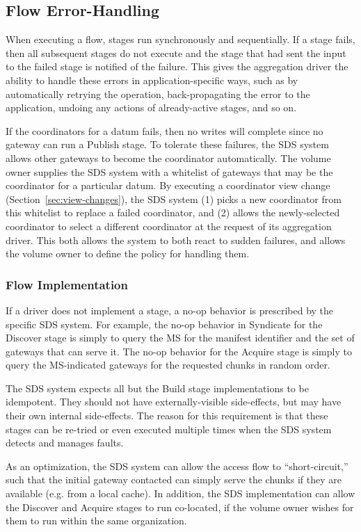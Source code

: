 \subsection{Flow Error-Handling}

When executing a flow, stages run synchronously and sequentially.
If a stage fails, then all subsequent stages do not execute
and the stage that had sent the input to the
failed stage is notified of the failure.  This gives the aggregation driver
the ability to handle these errors in application-specific ways, such as by
automatically retrying the operation, back-propagating the error to the application, 
undoing any actions of already-active stages, and so on.

If the coordinators for a datum fails, then no writes will complete since no
gateway can run a Publish stage.  To
tolerate these failures, the SDS system allows other gateways to
become the coordinator automatically.  The volume owner supplies the SDS system with a
whitelist of gateways that may be the coordinator for a particular datum.
By executing a coordinator view change (Section~\ref{sec:view-changes}), the SDS
system (1) picks a new coordinator from this
whitelist to replace a failed coordinator, and (2) allows the newly-selected coordinator
to select a different coordinator at the request of its aggregation driver.
This both allows the system to both react to sudden failures, and allows the volume
owner to define the policy for handling them.

\subsubsection{Flow Implementation}

If a driver does not implement a stage, a no-op behavior is prescribed by the
specific SDS system.  For example, the no-op behavior in Syndicate for the
Discover stage is simply to query the MS for the manifest identifier and the 
set of gateways that can serve it.  The no-op behavior for the Acquire
stage is simply to query the MS-indicated gateways for the requested chunks
in random order.

The SDS system expects all but the Build stage implementations to be
idempotent.  They should not have externally-visible side-effects, but may have
their own internal side-effects.  The reason
for this requirement is that these stages can be re-tried or even executed
multiple times when the SDS system detects and manages faults.

As an optimization, the SDS system can allow the access flow to
``short-circuit,'' such that the initial gateway contacted can simply serve the
chunks if they are available (e.g. from a local cache).  In addition, the SDS
implementation can allow the Discover and Acquire stages to run co-located, if
the volume owner wishes for them to run within the same organization.


